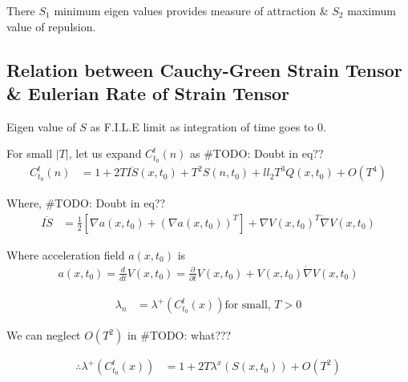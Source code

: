 \documentclass[../report.tex]{subfiles}
\begin{document}
There \(S_1\) \rightarrow minimum eigen values provides measure of attraction \& \(S_2\) maximum value of repulsion.

\subsection{Relation between Cauchy-Green Strain Tensor \& Eulerian Rate of Strain Tensor}
Eigen value of \(S\) as F.I.L.E limit as integration of time goes to 0. \par

For small \(|T|\), let us expand  \(C_{t_0}^t (n)\) as
\#TODO: Doubt in eq??
\begin{equation}
  \begin{aligned}
    C_{t_0}^t (n) &= 1 + 2T \overline{IS}(x, t_0) + T^2 S(n, t_0) + ll_2 T^3 Q(x, t_0) + O(T^4)
  \end{aligned}
\end{equation}

Where, 
\#TODO: Doubt in eq??
\begin{equation}
  \begin{aligned}
    \overline{IS} &= \frac{1}{2}[\nabla a(x, t_0) + (\nabla a(x, t_0))^T] + \nabla V(x, t_0)^T \dot \nabla V(x, t_0)
  \end{aligned}
\end{equation}

Where acceleration field \(a(x, t_0)\) is
\begin{equation}
  \begin{aligned}
    a(x, t_0) = \frac{d}{dt}V(x, t_0) = \frac{\partial}{\partial t} V(x, t_0) + V(x, t_0) \dot \nabla V(x, t_0)
  \end{aligned}
\end{equation}

\begin{equation}
  \begin{aligned}
    \lambda_n &= \lambda^+ (C_{t_0}^t (x)) \text{for small, } T > 0
  \end{aligned}
\end{equation}

We can neglect \(O(T^2)\) in \#TODO: what???

\begin{equation}
  \begin{aligned}
    \therefore \lambda^+ (C_{t_0}^t (x)) &= 1 + 2T \lambda^x (S(x, t_0)) + O(T^2)
  \end{aligned}
\end{equation}
\end{document}
